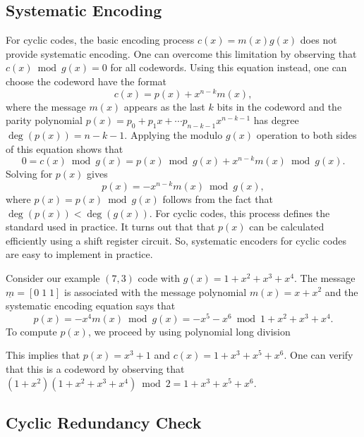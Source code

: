 \subsection{Systematic Encoding}

For cyclic codes, the basic encoding process $c(x)=m(x)g(x)$ does not provide systematic encoding.
One can overcome this limitation by observing that $c(x) \bmod g(x) = 0$ for all codewords.
Using this equation instead, one can choose the codeword have the format
\[ c(x) = p(x) + x^{n-k} m(x), \]
where the message $m(x)$ appears as the last $k$ bits in the codeword and the parity polynomial $p(x)=p_0 + p_1 x + \cdots p_{n-k-1} x^{n-k-1}$ has degree $\deg\left( p(x)\right) = n-k-1$.
Applying the modulo $g(x)$ operation to both sides of this equation shows that
\[ 0 = c(x) \bmod g(x) = p(x) \bmod g(x) + x^{n-k} m(x) \bmod g(x). \]
Solving for $p(x)$ gives
\[ p(x) = - x^{n-k} m(x) \bmod g(x), \]
where $p(x) = p(x) \bmod g(x)$ follows from the fact that $\deg\left( p(x)\right) < \deg\left( g(x)\right)$.
For cyclic codes, this process defines the standard  used in practice.
It turns out that that  $p(x)$ can be calculated efficiently using a shift register circuit.
So, systematic encoders for cyclic codes are easy to implement in practice.

\begin{example}
Consider our example $(7,3)$ code with $g(x) = 1 + x^2 + x^3 + x^4$.
The message $\underline{m} = [0\;1\;1]$ is associated with the message polynomial $m(x) = x+x^2$ and the systematic encoding equation says that
\[ p(x) = - x^4 m(x) \bmod g(x) = -x^5 - x^6 \bmod 1+x^2 + x^3 + x^4. \]
To compute $p(x)$, we proceed by using polynomial long division
\begin{center}
\end{center}
This implies that $p(x) = x^3+1$ and $c(x) = 1+x^3 + x^5 + x^6$.
One can verify that this is a codeword by observing that $(1+x^2)(1+x^2+x^3+x^4)\bmod 2 = 1+x^3+x^5+x^6$.
\end{example}

\subsection{Cyclic Redundancy Check}

